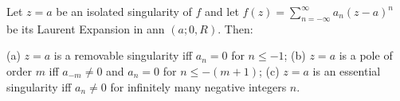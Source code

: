 Let $z = a$ be an isolated singularity of $f$ and let $f(z) = \sum_{n=-\infty}^{\infty} a_n(z-a)^n$ be its Laurent Expansion in ann $(a; 0, R)$. Then:

(a) $z = a$ is a removable singularity iff $a_n = 0$ for $n \leq -1$;
(b) $z = a$ is a pole of order $m$ iff $a_{-m} \neq 0$ and $a_n = 0$ for $n \leq -(m+1)$;
(c) $z = a$ is an essential singularity iff $a_n \neq 0$ for infinitely many negative integers $n$.